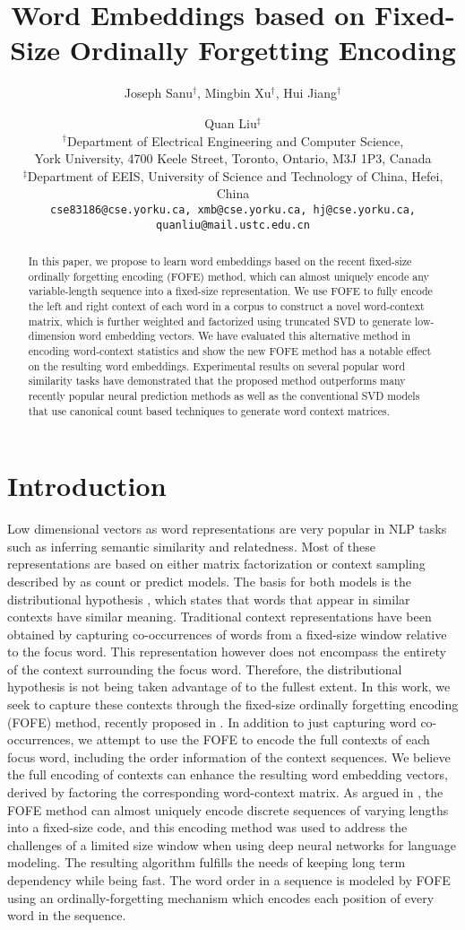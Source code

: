 \documentclass[11pt,letterpaper]{article}
\title{Word Embeddings based on Fixed-Size Ordinally Forgetting Encoding}
\author{Joseph Sanu$^\dagger$, Mingbin Xu$^\dagger$, Hui Jiang$^\dagger$ \and Quan Liu$^\ddagger$\\
$^\dagger$Department of Electrical Engineering and Computer Science, \\
York University, 4700 Keele Street, Toronto, Ontario, M3J 1P3, Canada \\
$^\ddagger$Department of EEIS, University of Science and Technology of China, Hefei, China \\
{\tt \small cse83186@cse.yorku.ca,   xmb@cse.yorku.ca,  hj@cse.yorku.ca, quanliu@mail.ustc.edu.cn}
}
\date{}
\begin{document}
\maketitle

\begin{abstract}
In this paper, we propose to learn word embeddings based on the recent fixed-size ordinally forgetting encoding (FOFE) method, which can almost uniquely encode any variable-length sequence into a fixed-size representation. We use FOFE to fully encode the left and right context of each word in a corpus to construct a novel word-context matrix, which is further weighted and factorized using truncated SVD to generate low-dimension word embedding vectors. We have evaluated this alternative method in encoding word-context statistics and show the new FOFE method has a notable effect on the resulting word embeddings. Experimental results on several popular word similarity tasks have demonstrated that the proposed method outperforms many recently popular neural prediction methods as well as the conventional SVD models that use canonical count based techniques to generate word context matrices.
\end{abstract}


\section{Introduction}

Low dimensional vectors as word representations are very popular in NLP tasks such as inferring semantic similarity and relatedness. Most of these representations are based on either matrix factorization or context sampling described by \cite{baroni2014don} as count or predict models. The basis for both models is the distributional hypothesis \cite{harris1954distributional}, which states that words that appear in similar contexts have similar meaning.
Traditional context representations have been obtained by capturing co-occurrences of words from a fixed-size window relative to the focus word. This representation however does not encompass the entirety of the context surrounding the focus word. Therefore, the distributional hypothesis is not being taken advantage of to the fullest extent.
In this work, we seek to capture these contexts through the fixed-size ordinally forgetting encoding (FOFE) method, recently proposed in \cite{zhang}. In addition to just capturing word co-occurrences, we attempt to use the FOFE to encode the full contexts of each focus word, including the order information of the context sequences. We believe the full encoding of contexts can enhance the resulting word embedding vectors, derived by factoring the corresponding word-context matrix. 
As argued in \cite{zhang}, the FOFE method can almost uniquely encode discrete sequences of varying lengths into a fixed-size code, and this encoding method was used to address the challenges of a limited size window when using deep neural networks for language modeling. The resulting algorithm fulfills the needs of keeping long term dependency while being fast. The word order in a sequence is modeled by FOFE using an ordinally-forgetting mechanism which encodes each position of every word in the sequence.
\end{document}
